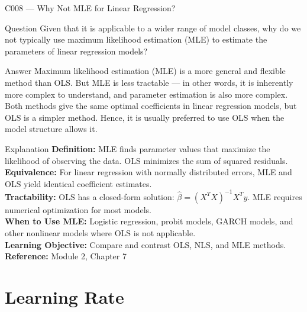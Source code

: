 \documentclass[aspectratio=169,8pt]{beamer}
\begin{document}
	\begin{frame}{C008 --- Why Not MLE for Linear Regression?}
		\begin{block}{Question}
			Given that it is applicable to a wider range of model classes, why do we not typically use maximum likelihood estimation (MLE) to estimate the parameters of linear regression models?
		\end{block}
		\begin{block}{Answer}
			Maximum likelihood estimation (MLE) is a more general and flexible method than OLS. But MLE is less tractable --- in other words, it is inherently more complex to understand, and parameter estimation is also more complex. Both methods give the same optimal coefficients in linear regression models, but OLS is a simpler method. Hence, it is usually preferred to use OLS when the model structure allows it.
		\end{block}
		\begin{block}{Explanation}
			\textbf{Definition:} MLE finds parameter values that maximize the likelihood of observing the data. OLS minimizes the sum of squared residuals.\\
			\textbf{Equivalence:} For linear regression with normally distributed errors, MLE and OLS yield identical coefficient estimates.\\
			\textbf{Tractability:} OLS has a closed-form solution: $\hat{\beta} = (X^TX)^{-1}X^Ty$. MLE requires numerical optimization for most models.\\
			\textbf{When to Use MLE:} Logistic regression, probit models, GARCH models, and other nonlinear models where OLS is not applicable.\\
			\textbf{Learning Objective:} Compare and contrast OLS, NLS, and MLE methods.\\
			\textbf{Reference:} Module 2, Chapter 7
		\end{block}
	\end{frame}
	
	\section{Learning Rate}
	
\end{document}
